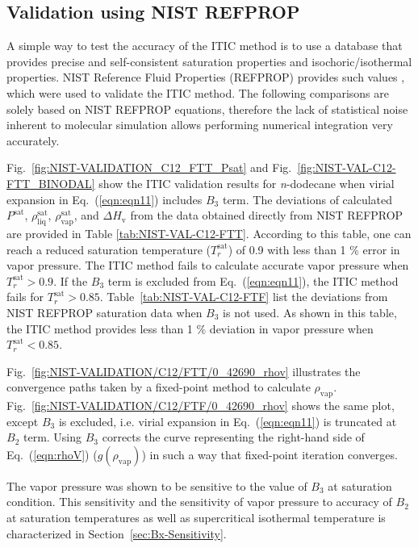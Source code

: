 \documentclass[%
 aip,
 jcp,
 sd,%
 amsmath,amssymb,
 reprint,%
]{revtex4-1}
\begin{document}
\subsection{Validation using NIST REFPROP} \label{sec:NIST-VAL}
A simple way to test the accuracy of the ITIC method is to use a database that provides precise and self-consistent saturation properties and isochoric/isothermal properties. NIST Reference Fluid Properties (REFPROP) provides such values \cite{LEMMON-RP91,Bucker2006,Lemmon2004,Wagner2002}, which were used to validate the ITIC method. The following comparisons are solely based on NIST REFPROP equations, therefore the lack of statistical noise inherent to molecular simulation allows performing numerical integration very accurately. 

Fig.~\ref{fig:NIST-VALIDATION_C12_FTT_Psat} and Fig.~\ref{fig:NIST-VAL-C12-FTT_BINODAL} show the ITIC validation results for \textit{n}-dodecane when virial expansion in Eq.~(\ref{eqn:eqn11}) includes $B_{3}$ term. The deviations of calculated $P^{\mathrm{sat}}$, $\rho_{\mathrm{liq}}^{\mathrm{sat}}$, $\rho_{\mathrm{vap}}^{\mathrm{sat}}$, and $\Delta H_{\mathrm{v}}$ from the data obtained directly from NIST REFPROP \cite{Lemmon2004} are provided in Table \ref{tab:NIST-VAL-C12-FTT}. According to this table, one can reach a reduced saturation temperature ($T_r^{\mathrm{sat}}$) of 0.9 with less than 1 \% error in vapor pressure. The ITIC method fails to calculate accurate vapor pressure when $T_r^{\mathrm{sat}}>0.9$. If the $B_3$ term is excluded from Eq.~(\ref{eqn:eqn11}), the ITIC method fails for $T_r^{\mathrm{sat}} > 0.85$. Table~\ref{tab:NIST-VAL-C12-FTF} list the deviations from NIST REFPROP saturation data when $B_3$ is not used. As shown in this table, the ITIC method provides less than 1 \% deviation in vapor pressure when $T_r^{\mathrm{sat}} < 0.85$.

Fig.~\ref{fig:NIST-VALIDATION/C12/FTT/0_42690_rhov} illustrates the convergence paths taken by a fixed-point method to calculate $\rho_{\mathrm{vap}}$. Fig.~\ref{fig:NIST-VALIDATION/C12/FTF/0_42690_rhov} shows the same plot, except $B_3$ is excluded, i.e. virial expansion in Eq.~(\ref{eqn:eqn11}) is truncated at $B_{2}$ term. Using $B_3$ corrects the curve representing the right-hand side of Eq.~(\ref{eqn:rhoV}) ($g(\rho_{\mathrm{vap}})$) in such a way that fixed-point iteration converges. 

The vapor pressure was shown to be sensitive to the value of $B_3$ at saturation condition. This sensitivity and the sensitivity of vapor pressure to accuracy of $B_2$ at saturation temperatures as well as supercritical isothermal temperature is characterized in Section~\ref{sec:Bx-Sensitivity}.
\end{document}
